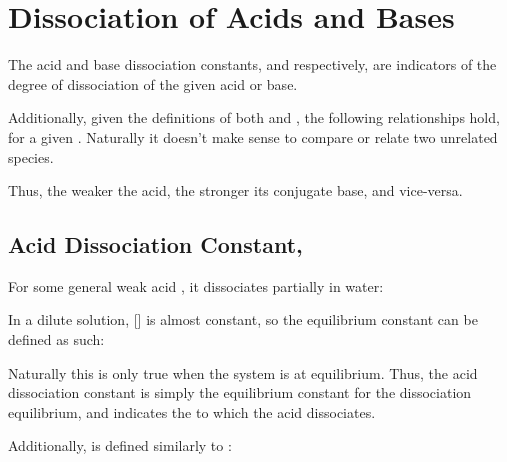 


	\pagebreak
	\section{Dissociation of Acids and Bases}

		The acid and base dissociation constants, \Ka{} and \Kb{} respectively, are indicators of the degree of dissociation of the given acid
		or base.

		Additionally, given the definitions of both \Ka{} and \Kb{}, the following relationships hold, for a given
		. Naturally it doesn't make sense to compare or relate two unrelated species.


		Thus, the weaker the acid, the stronger its conjugate base, and vice-versa.


		\subsection{Acid Dissociation Constant, \texorpdfstring{\Ka{}}{Ka}}

			For some general weak acid , it dissociates partially in water:


			In a dilute solution, [] is almost constant, so the equilibrium constant can be defined as such:

			\eqndiagram{
				\[ K_{a} = \frac{[\ch{H+}][\ch{A-}]}{[\ch{HA}]} \]
			}

			Naturally this is only true when the system is at equilibrium. Thus, the acid dissociation constant \Ka{} is simply the
			equilibrium constant for the dissociation equilibrium, and indicates the  to which the acid dissociates.

			Additionally, \pKa{} is defined similarly to \pKw{}:

